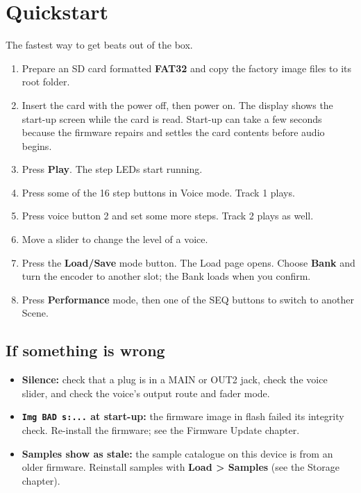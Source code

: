 \section{Quickstart}\label{quickstart}

The fastest way to get beats out of the box.


\begin{enumerate}
\def\labelenumi{\arabic{enumi}.}
\tightlist
\item
  Prepare an SD card formatted \textbf{FAT32} and copy the factory image
  files to its root folder.
\item
  Insert the card with the power off, then power on. The display shows
  the start-up screen while the card is read. Start-up can take a few
  seconds because the firmware repairs and settles the card contents
  before audio begins.
\item
  Press \textbf{Play}. The step LEDs start running.
\item
  Press some of the 16 step buttons in Voice mode. Track 1 plays.
\item
  Press voice button 2 and set some more steps. Track 2 plays as well.
\item
  Move a slider to change the level of a voice.
\item
  Press the \textbf{Load/Save} mode button. The Load page opens. Choose
  \textbf{Bank} and turn the encoder to another slot; the Bank loads
  when you confirm.
\item
  Press \textbf{Performance} mode, then one of the SEQ buttons to switch
  to another Scene.
\end{enumerate}

\subsection{If something is wrong}\label{if-something-is-wrong}

\begin{itemize}
\tightlist
\item
  \textbf{Silence:} check that a plug is in a MAIN or OUT2 jack, check
  the voice slider, and check the voice's output route and fader mode.
\item
  \textbf{\texttt{Img\ BAD\ s:...} at start-up:} the firmware image in
  flash failed its integrity check. Re-install the firmware; see the
  Firmware Update chapter.
\item
  \textbf{Samples show as stale:} the sample catalogue on this device is
  from an older firmware. Reinstall samples with \textbf{Load
  \textgreater{} Samples} (see the Storage chapter).
\end{itemize}

